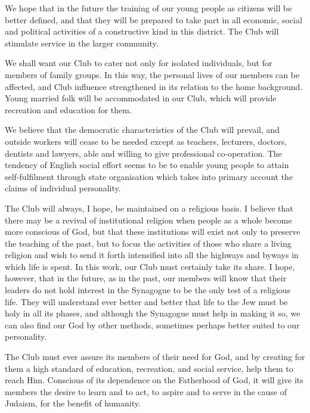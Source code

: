 We hope that in the future the training of our young
people as citizens will be better defined, and that they will
be prepared to take part in all economic, social and political
activities of a constructive kind in this district. The
Club will stimulate service in the larger community.

We shall want our Club to cater not only for isolated
individuals, but for members of family groups. In this
way, the personal lives of our members can be affected,
and Club influence strengthened in its relation to the
home background. Young married folk will be accommodated
in our Club, which will provide recreation and
education for them.

We believe that the democratic characteristics of the
Club will prevail, and outside workers will cease to be
needed except as teachers, lecturers, doctors, dentists
and lawyers, able and willing to give professional
co-operation. The tendency of English social effort seems to
be to enable young people to attain self-fulfilment through
state organisation which takes into primary account the
claims of individual personality.

The Club will always, I hope, be maintained on a
religious basis. I believe that there may be a revival of
institutional religion when people as a whole become more
conscious of God, but that these institutions will exist not
only to preserve the teaching of the past, but to focus the
activities of those who share a living religion and wish to
send it forth intensified into all the highways and byways
in which life is spent. In this work, our Club must certainly
take its share. I hope, however, that in the future,
as in the past, our members will know that their leaders
do not hold interest in the Synagogue to be the only test
of a religious life. They will understand ever better and
better that life to the Jew must be holy in all its phases,
and although the Synagogue must help in making it so,
we can also find our God by other methods, sometimes
perhaps better suited to our personality.

The Club must ever assure its members of their need
for God, and by creating for them a high standard of
education, recreation, and social service, help them to
reach Him. Conscious of its dependence on the
Fatherhood of God, it will give its members the desire to
learn and to act, to aspire and to serve in the cause of
Judaism, for the benefit of humanity.
